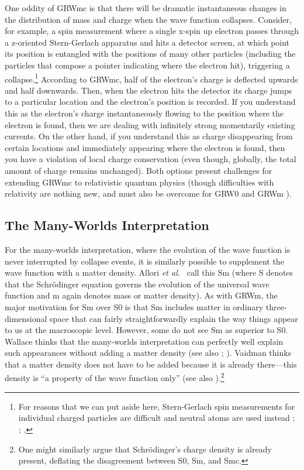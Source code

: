 \documentclass[12pt,onecolumn,secnumarabic,amsmath,amssymb,balancelastpage,nofootinbib]{article}
\begin{document}
One oddity of GRWmc is that there will be dramatic instantaneous changes in the distribution of mass and charge when the wave function collapses.  Consider, for example, a spin measurement where a single x-spin up electron passes through a z-oriented Stern-Gerlach apparatus and hits a detector screen, at which point its position is entangled with the positions of many other particles (including the particles that compose a pointer indicating where the electron hit), triggering a collapse.\footnote{For reasons that we can put aside here, Stern-Gerlach spin measurements for individual charged particles are difficult and neutral atoms are used instead \cite[pg.\ 230]{ballentine}; \cite[pg.\ 181]{griffithsQM}; \cite[sec.\ 2]{electronsspinmeasurement}.}  According to GRWmc, half of the electron's charge is deflected upwards and half downwards.  Then, when the electron hits the detector its charge jumps to a particular location and the electron's position is recorded.  If you understand this as the electron's charge instantaneously flowing to the position where the electron is found, then we are dealing with infinitely strong momentarily existing currents.  On the other hand, if you understand this as charge disappearing from certain locations and immediately appearing where the electron is found, then you have a violation of local charge conservation (even though, globally, the total amount of charge remains unchanged).  Both options present challenges for extending GRWmc to relativistic quantum physics (though difficulties with relativity are nothing new, and must also be overcome for GRW0 and GRWm \cite{tumulka2007, maudlin2011, bedingham2014}).



\subsection{The Many-Worlds Interpretation}

For the many-worlds interpretation, where the evolution of the wave function is never interrupted by collapse events, it is similarly possible to supplement the wave function with a matter density.  Allori \emph{et al.}\ \cite{allori2008, allori2011} call this Sm (where S denotes that the Schr\"{o}dinger equation governs the evolution of the universal wave function and m again denotes mass or matter density).  As with GRWm, the major motivation for Sm over S0 is that Sm includes matter in ordinary three-dimensional space that can fairly straightforwardly explain the way things appear to us at the macroscopic level.  However, some do not see Sm as superior to S0.  Wallace \cite{wallace2010, wallace2013} thinks that the many-worlds interpretation can perfectly well explain such appearances without adding a matter density (see also \cite{ney2013}; \cite[sec.\ 10.3]{norsen2017}).  Vaidman \cite[sec.\ 3.1]{vaidman2018} thinks that a matter density does not have to be added because it is already there---this density is ``a property of the wave function only'' (see also \cite{lewis2018}).\footnote{One might similarly argue that Schr\"{o}dinger's charge density is already present, deflating the disagreement between S0, Sm, and Smc.}
\end{document}
